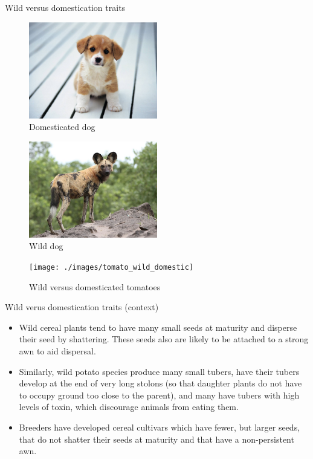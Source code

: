 \documentclass[11pt,ignorenonframetext,aspectratio=169]{beamer}
\begin{document}
\begin{frame}{Wild versus domestication traits}
\protect\hypertarget{wild-versus-domestication-traits}{}
\begin{figure}
\includegraphics[width=0.5\textwidth, keepaspectratio,height=0.35\textheight]{./images/domestic_dog_puppy} \caption{Domesticated dog}\label{fig:domesticated}
\end{figure}

\begin{figure}
\includegraphics[width=0.5\textwidth, keepaspectratio,height=0.35\textheight]{./images/wild_dog_african} \caption{Wild dog}\label{fig:wild}
\end{figure}
\end{frame}

\begin{frame}{}
\protect\hypertarget{section-4}{}
\begin{figure}
\texttt{[image: ./images/tomato\_wild\_domestic]} \caption{Wild versus domesticated tomatoes}\label{fig:wild-vs-domesticated-tomato}
\end{figure}
\end{frame}

\begin{frame}{Wild verus domestication traits (context)}
\protect\hypertarget{wild-verus-domestication-traits-context}{}
\begin{itemize}
\item
  Wild cereal plants tend to have many small seeds at maturity and
  disperse their seed by shattering. These seeds also are likely to be
  attached to a strong awn to aid dispersal.
\item
  Similarly, wild potato species produce many small tubers, have their
  tubers develop at the end of very long stolons (so that daughter
  plants do not have to occupy ground too close to the parent), and many
  have tubers with high levels of toxin, which discourage animals from
  eating them.
\item
  Breeders have developed cereal cultivars which have fewer, but larger
  seeds, that do not shatter their seeds at maturity and that have a
  non-persistent awn.
\end{itemize}
\end{frame}
\end{document}

